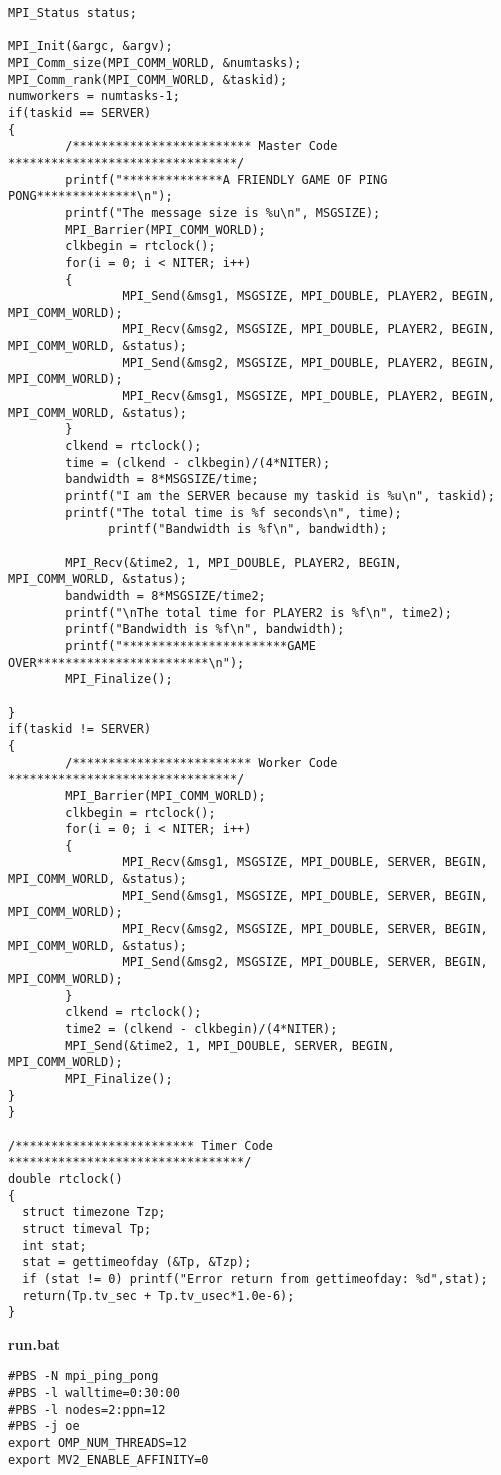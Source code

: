 \documentclass[11pt]{article}
\begin{document}
\begin{enumerate}
\begin{center}
\begin{lstlisting}
MPI_Status status;

MPI_Init(&argc, &argv);
MPI_Comm_size(MPI_COMM_WORLD, &numtasks);
MPI_Comm_rank(MPI_COMM_WORLD, &taskid);
numworkers = numtasks-1;
if(taskid == SERVER)
{
        /************************* Master Code ********************************/
        printf("**************A FRIENDLY GAME OF PING PONG**************\n");
        printf("The message size is %u\n", MSGSIZE);
        MPI_Barrier(MPI_COMM_WORLD);
        clkbegin = rtclock();
        for(i = 0; i < NITER; i++)
        {
                MPI_Send(&msg1, MSGSIZE, MPI_DOUBLE, PLAYER2, BEGIN, MPI_COMM_WORLD);
                MPI_Recv(&msg2, MSGSIZE, MPI_DOUBLE, PLAYER2, BEGIN, MPI_COMM_WORLD, &status);
                MPI_Send(&msg2, MSGSIZE, MPI_DOUBLE, PLAYER2, BEGIN, MPI_COMM_WORLD);
                MPI_Recv(&msg1, MSGSIZE, MPI_DOUBLE, PLAYER2, BEGIN, MPI_COMM_WORLD, &status);
        }
        clkend = rtclock();
        time = (clkend - clkbegin)/(4*NITER);
        bandwidth = 8*MSGSIZE/time;
        printf("I am the SERVER because my taskid is %u\n", taskid);
        printf("The total time is %f seconds\n", time);
              printf("Bandwidth is %f\n", bandwidth);

        MPI_Recv(&time2, 1, MPI_DOUBLE, PLAYER2, BEGIN, MPI_COMM_WORLD, &status);
        bandwidth = 8*MSGSIZE/time2;
        printf("\nThe total time for PLAYER2 is %f\n", time2);
        printf("Bandwidth is %f\n", bandwidth);
        printf("***********************GAME OVER************************\n");
        MPI_Finalize();

}
if(taskid != SERVER)
{
        /************************* Worker Code ********************************/
        MPI_Barrier(MPI_COMM_WORLD);
        clkbegin = rtclock();
        for(i = 0; i < NITER; i++)
        {
                MPI_Recv(&msg1, MSGSIZE, MPI_DOUBLE, SERVER, BEGIN, MPI_COMM_WORLD, &status);
                MPI_Send(&msg1, MSGSIZE, MPI_DOUBLE, SERVER, BEGIN, MPI_COMM_WORLD);
                MPI_Recv(&msg2, MSGSIZE, MPI_DOUBLE, SERVER, BEGIN, MPI_COMM_WORLD, &status);
                MPI_Send(&msg2, MSGSIZE, MPI_DOUBLE, SERVER, BEGIN, MPI_COMM_WORLD);
        }
        clkend = rtclock();
        time2 = (clkend - clkbegin)/(4*NITER);
        MPI_Send(&time2, 1, MPI_DOUBLE, SERVER, BEGIN, MPI_COMM_WORLD);
        MPI_Finalize();
}
}

/************************* Timer Code *********************************/
double rtclock()
{
  struct timezone Tzp;
  struct timeval Tp;
  int stat;
  stat = gettimeofday (&Tp, &Tzp);
  if (stat != 0) printf("Error return from gettimeofday: %d",stat);
  return(Tp.tv_sec + Tp.tv_usec*1.0e-6);
}
\end{lstlisting}
\textbf{run.bat}
\begin{lstlisting}
#PBS -N mpi_ping_pong
#PBS -l walltime=0:30:00
#PBS -l nodes=2:ppn=12
#PBS -j oe
export OMP_NUM_THREADS=12
export MV2_ENABLE_AFFINITY=0


\end{lstlisting}
\end{center}
\end{enumerate}
\end{document}
